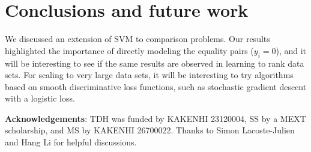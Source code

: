\documentclass{article}
\newcommand{\RR}{\mathbb R}
\begin{document}
\section{Conclusions and future work}
\label{sec:conclusions}

We discussed an extension of SVM to comparison problems. Our results
highlighted the importance of directly modeling the equality pairs
($y_i=0$), and it will be interesting to see if the same results are
observed in learning to rank data sets. For scaling to very large data
sets, it will be interesting to try algorithms based on smooth
discriminative loss functions, such as stochastic gradient descent
with a logistic loss.

\textbf{Acknowledgements}: TDH was funded by KAKENHI 23120004, SS by a
MEXT scholarship, and MS by KAKENHI 26700022. Thanks to Simon
Lacoste-Julien and Hang Li for helpful discussions.




\begin{figure*}[b!]
  \centering
  
  \vskip -1cm
  \caption{Application to simulated patterns $x,x'\in\RR^2$, where the
    ranking functions $r(x)=||x||^2$ are squared norms (panels from
    left to right). \textbf{Top}: the training data are $n=100$ pairs,
    half equality (segments indicate two points of equal rank),
    and half inequality (arrows point to the higher
    rank). \textbf{Middle and bottom}: level curves of the ranking
    functions learned by SVMrank and SVMcompare. SVMrank ignores the
    equality pairs, so in general SVMcompare recovers the latent
    pattern better.}
  \label{fig:norm-level-curves}
\end{figure*}

\begin{figure*}[b!]
  
  \vskip -1cm
  \caption{Test error of SVMrank and SVMcompare (the Bayes error rate
    of the latent $r$ is shown for comparison). We plot mean and
    standard deviation of the prediction error across 4 randomly
    chosen data sets, as a function of training set size $n$ (a
    vertical line shows the data set size $n=100$ which was used in
    Figure~\ref{fig:norm-level-curves}). It is clear that in general
    SVMcompare makes better predictions on the test data.}
  \label{fig:simulation-samples}
\end{figure*}
\end{document}
